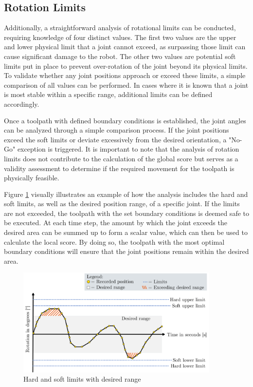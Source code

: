 \subsection{Rotation Limits}\label{RotLim}
Additionally, a straightforward analysis of rotational limits can be conducted, requiring knowledge of four distinct values. The first two values are the upper and lower physical limit that a joint cannot exceed, as surpassing those limit can cause significant damage to the robot. The other two values are potential soft limits put in place to prevent over-rotation of the joint beyond its physical limits. To validate whether any joint positions approach or exceed these limits, a simple comparison of all values can be performed. In cases where it is known that a joint is most stable within a specific range, additional limits can be defined accordingly.

Once a toolpath with defined boundary conditions is established, the joint angles can be analyzed through a simple comparison process. If the joint positions exceed the soft limits or deviate excessively from the desired orientation, a "No-Go" exception is triggered. It is important to note that the analysis of rotation limits does not contribute to the calculation of the global score but serves as a validity assessment to determine if the required movement for the toolpath is physically feasible.

Figure \ref{limits} visually illustrates an example of how the analysis includes the hard and soft limits, as well as the desired position range, of a specific joint. If the limits are not exceeded, the toolpath with the set boundary conditions is deemed safe to be executed. At each time step, the amount by which the joint exceeds the desired area can be summed up to form a scalar value, which can then be used to calculate the local score. By doing so, the toolpath with the most optimal boundary conditions will ensure that the joint positions remain within the desired area.

\begin{figure}[H]
	\centerline{\includegraphics[width=0.9\textwidth]{figures/limits.png}}
	\caption{Hard and soft limits with desired range}
	\label{limits}
\end{figure}

